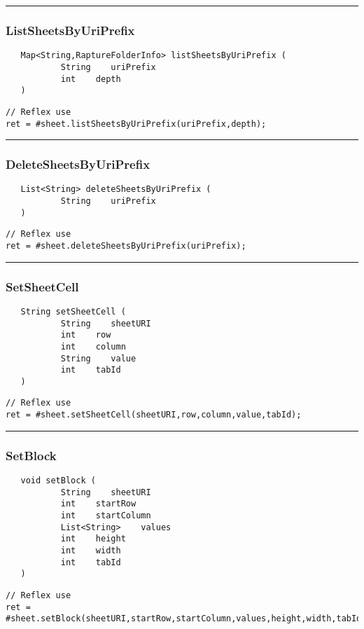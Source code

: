 \rule{15cm}{2pt}
\subsubsection{ListSheetsByUriPrefix}
\label{Api:ListSheetsByUriPrefix}
\begin{verbatim}
   Map<String,RaptureFolderInfo> listSheetsByUriPrefix (
           String    uriPrefix
           int    depth
   )
\end{verbatim}
\begin{lstlisting}[language=reflex]
// Reflex use
ret = #sheet.listSheetsByUriPrefix(uriPrefix,depth);
\end{lstlisting}



\rule{15cm}{2pt}
\subsubsection{DeleteSheetsByUriPrefix}
\label{Api:DeleteSheetsByUriPrefix}
\begin{verbatim}
   List<String> deleteSheetsByUriPrefix (
           String    uriPrefix
   )
\end{verbatim}
\begin{lstlisting}[language=reflex]
// Reflex use
ret = #sheet.deleteSheetsByUriPrefix(uriPrefix);
\end{lstlisting}



\rule{15cm}{2pt}
\subsubsection{SetSheetCell}
\label{Api:SetSheetCell}
\begin{verbatim}
   String setSheetCell (
           String    sheetURI
           int    row
           int    column
           String    value
           int    tabId
   )
\end{verbatim}
\begin{lstlisting}[language=reflex]
// Reflex use
ret = #sheet.setSheetCell(sheetURI,row,column,value,tabId);
\end{lstlisting}



\rule{15cm}{2pt}
\subsubsection{SetBlock}
\label{Api:SetBlock}
\begin{verbatim}
   void setBlock (
           String    sheetURI
           int    startRow
           int    startColumn
           List<String>    values
           int    height
           int    width
           int    tabId
   )
\end{verbatim}
\begin{lstlisting}[language=reflex]
// Reflex use
ret = #sheet.setBlock(sheetURI,startRow,startColumn,values,height,width,tabId);
\end{lstlisting}



